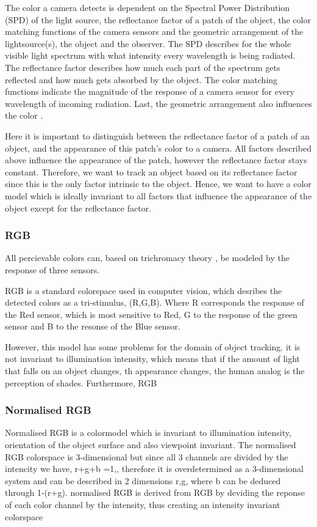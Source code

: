 \documentclass[a4paper,11pt]{article}
\begin{document}
The color a camera detects is dependent on the Spectral Power Distribution (SPD) of the light source, the reflectance factor of a patch of the object, the color matching functions of the camera sensors and the geometric arrangement of the lightsource(s), the object and the observer. The SPD describes for the whole visible light spectrum with what intensity every wavelength is being radiated. The reflectance factor  describes how much each part of the spectrum gets reflected and how much gets absorbed by the object. The color matching functions indicate the magnitude of the response of a camera sensor for every wavelength of incoming radiation. Last, the geometric arrangement also influences the color \cite{gevers_color}.

Here it is important to distinguish between the reflectance factor of a patch of an object, and the appearance of this patch's color to a camera. All factors described above influence the appearance of the patch, however the reflectance factor stays constant. Therefore, we want to track an object based on its reflectance factor since this is the only factor intrinsic to the object.  Hence, we want to have a color model which is ideally invariant to all factors that influence the appearance of the object except for the reflectance factor.  

\subsubsection{RGB}
		
		All percievable colors can, based on trichromacy theory \cite{gevers_color}, be modeled by the response of three sensors. 
		
		RGB is a standard colorspace used in computer vision, which desribes the detected colors as a tri-stimulus, (R,G,B). Where R corresponds the response of the Red sensor, which is most sensitive to Red, G to the response of the green sensor and B to the resonse of the Blue sensor.

		However, this model has some problems for the domain of object tracking. it is not invariant to illumination intensity, which means that if the amount of light that falls on an object changes, th appearance changes, the human analog is the perception of shades. 
		Furthermore, RGB 
		

		
\subsubsection{Normalised RGB}
		Normalised RGB is a colormodel which is invariant to illumination intensity, orientation of the object surface and also viewpoint invariant. 
		The normalised RGB colorspace is 3-dimensional but since all 3 channels are divided by the intencity we have, r+g+b =1,, therefore it is overdetermined as a 3-dimensional system and can be described in 2 dimensions r,g, where b can be deduced through 1-(r+g).
		normalised RGB is derived from RGB by deviding the reponse of each color channel by the intensity, thus creating an intensity invariant colorspace
		
\end{document}
